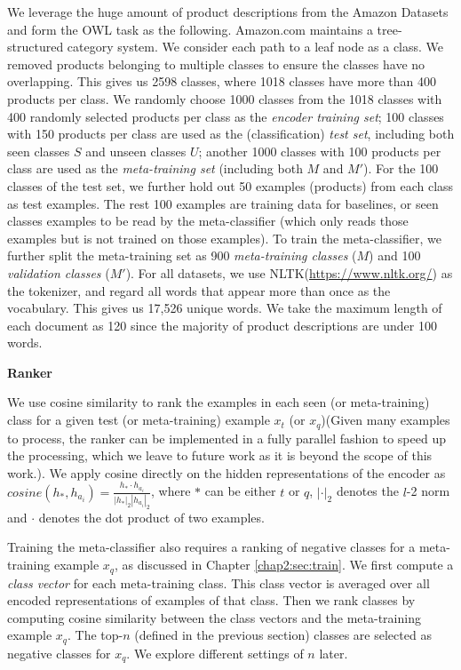 We leverage the huge amount of product descriptions from the Amazon Datasets \cite{he2016ups} and form the OWL task as the following.
Amazon.com maintains a tree-structured category system. 
We consider each path to a leaf node as a class.
We removed products belonging to multiple classes to ensure the classes have no overlapping.
This gives us 2598 classes, where 1018 classes have more than 400 products per class.
We randomly choose 1000 classes from the 1018 classes with 400 randomly selected products per class as the \textit{encoder training set};
100 classes with 150 products per class are used as the (classification) \textit{test set}, including both seen classes $S$ and unseen classes $U$;
another 1000 classes with 100 products per class are used as the \textit{meta-training set} (including both $M$ and $M'$).
For the 100 classes of the test set, we further hold out 50 examples (products) from each class as test examples. 
The rest 100 examples are training data for baselines, or seen classes examples to be read by the meta-classifier (which only reads those examples but is not trained on those examples).
To train the meta-classifier, we further split the meta-training set as 900 \textit{meta-training classes} ($M$) and 100 \textit{validation classes} ($M'$).
For all datasets, we use NLTK(\url{https://www.nltk.org/}) as the tokenizer, and regard all words that appear more than once as the vocabulary.
This gives us 17,526 unique words.
We take the maximum length of each document as 120 since the majority of product descriptions are under 100 words.

\textbf{Ranker}

We use cosine similarity to rank the examples in each seen (or meta-training) class for a given test (or meta-training) example $x_t$ (or $x_q$)(Given many examples to process, the ranker can be implemented in a fully parallel fashion to speed up the processing, which we leave to future work as it is beyond the scope of this work.).
We apply cosine directly on the hidden representations of the encoder as $cosine(h_*, h_{a_{i}})=\frac{h_* \cdot h_{a_{i}}}{|h_*|_2|h_{a_{i}}|_2}$, where $*$ can be either $t$ or $q$, $|\cdot|_2$ denotes the $l$-2 norm and $\cdot$ denotes the dot product of two examples.

Training the meta-classifier also requires a ranking of negative classes for a meta-training example $x_q$, as discussed in Chapter \ref{chap2:sec:train}.
We first compute a \textit{class vector} for each meta-training class. 
This class vector is averaged over all encoded representations of examples of that class.
Then we rank classes by computing cosine similarity between the class vectors and the meta-training example $x_q$.
The top-$n$ (defined in the previous section) classes are selected as negative classes for $x_q$.
We explore different settings of $n$ later.


